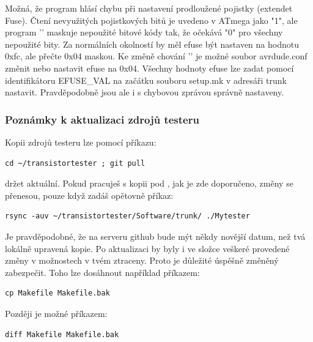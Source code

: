 Možná, že program  hlásí chybu při nastavení prodloužené pojistky (extendet Fuse).
Čtení nevyužitých pojistkových bitů je uvedeno v ATmega jako "1", ale
program '' maskuje nepoužité bitové kódy tak, že očekává "0" pro všechny nepoužité bity.
Za normálních okolností by měl efuse být nastaven na hodnotu 0xfc, ale  přečte 0x04 maskou.
Ke změně chování '' je možné soubor avrdude.conf změnit nebo nastavit efuse na 0x04.
Všechny hodnoty efuse lze zadat pomocí identifikátoru EFUSE\_VAL na začátku souboru setup.mk v adresáři
trunk nastavit. Pravděpodobně jsou ale  i s chybovou zprávou správně nastaveny.
\vspace*{-0.3em}
\subsubsection{Poznámky k aktualizaci zdrojů testeru}
Kopii zdrojů testeru lze pomocí příkazu:
\begin{large} \vspace{-0.4em} \begin{verbatim}
cd ~/transistortester ; git pull
\end{verbatim} \end{large}

držet aktuální.
Pokud pracuješ s kopii pod , jak je zde doporučeno,
změny se přenesou, pouze když zadáš opětovně příkaz:
\begin{large} \vspace{-0.4em} \begin{verbatim}
rsync -auv ~/transistortester/Software/trunk/ ./Mytester
\end{verbatim} \end{large}

Je pravděpodobné, že  na serveru github bude mýt někdy novější datum, než tvá lokálně upravená kopie. Po aktualizaci by byly i ve složce veškeré provedené  změny v možnostech v tvém  ztraceny.
Proto je důležité úspěšně změněný  zabezpečit. Toho lze dosáhnout například příkazem:
\begin{large} \vspace{-0.4em} \begin{verbatim}
cp Makefile Makefile.bak
\end{verbatim} \end{large}

Později je možné příkazem:
\begin{large} \vspace{-0.4em} \begin{verbatim}
diff Makefile Makefile.bak
\end{verbatim} \end{large}

